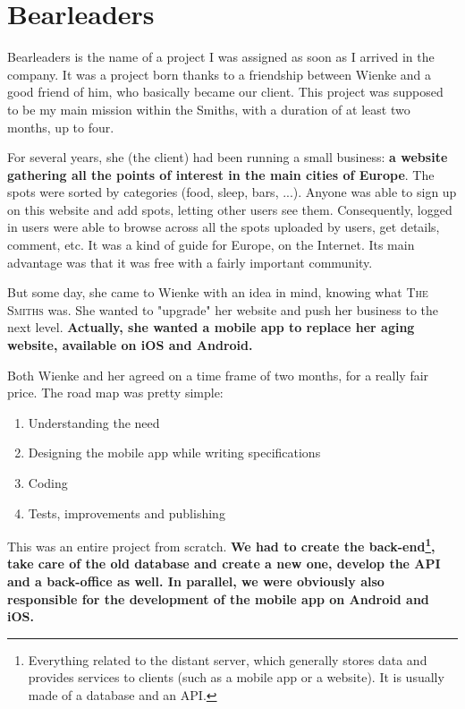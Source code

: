 \chapter{Bearleaders}

Bearleaders is the name of a project I was assigned as soon as I arrived in the company. It was a project born thanks to a friendship between Wienke and a good friend of him, who basically became our client. This project was supposed to be my main mission within the Smiths, with a duration of at least two months, up to four.

\medskip

For several years, she (the client) had been running a small business: \textbf{a website gathering all the points of interest in the main cities of Europe}. The spots were sorted by categories (food, sleep, bars, ...). Anyone was able to sign up on this website and add spots, letting other users see them. Consequently, logged in users were able to browse across all the spots uploaded by users, get details, comment, etc. It was a kind of guide for Europe, on the Internet. Its main advantage was that it was free with a fairly important community.

\medskip

But some day, she came to Wienke with an idea in mind, knowing what \textsc{The Smiths} was. She wanted to "upgrade" her website and push her business to the next level. \textbf{Actually, she wanted a mobile app to replace her aging website, available on iOS and Android.}

\medskip

Both Wienke and her agreed on a time frame of two months, for a really fair price. The road map was pretty simple:

\begin{enumerate}
  \item Understanding the need
  \item Designing the mobile app while writing specifications
  \item Coding
  \item Tests, improvements and publishing
\end{enumerate}

This was an entire project from scratch. \textbf{We had to create the back-end\footnote{Everything related to the distant server, which generally stores data and provides services to clients (such as a mobile app or a website). It is usually made of a database and an API.}, take care of the old database and create a new one, develop the API and a back-office as well. In parallel, we were obviously also responsible for the development of the mobile app on Android and iOS.}

